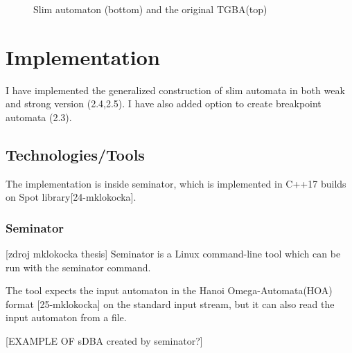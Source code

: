 \documentclass[
	digital
nolof, nolot
]{fithesis3}
\begin{document}
\begin{figure}[ht]
\begin{center}
				\end{center}
				\caption{Slim automaton (bottom) and the original TGBA(top)}
				\label{fig:slim:gg}
			\end{figure}
			

			
	\chapter{Implementation}
		I have implemented the generalized construction of slim automata in both weak and strong version (2.4,2.5). I have also added option to create breakpoint automata (2.3).
		
		\section{Technologies/Tools}
		The implementation is inside seminator, which is implemented in C++17 builds on Spot library[24-mklokocka].
		\subsection{Seminator} [zdroj mklokocka thesis] 
		Seminator is a Linux command-line tool which can be run with the seminator command.
		
		The tool expects the input automaton in the Hanoi Omega-Automata(HOA) format [25-mklokocka] on the standard input stream, but it can also read the input automaton from a file.
		
		[EXAMPLE OF sDBA created by seminator?]
		
\end{document}
